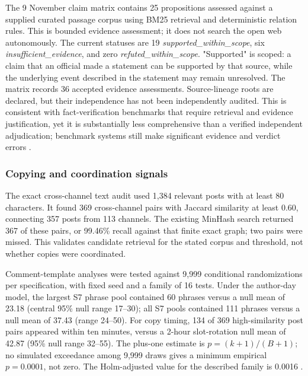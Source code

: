 The 9 November claim matrix contains 25 propositions assessed against a supplied curated passage corpus using BM25 retrieval and deterministic relation rules. This is bounded evidence assessment; it does not search the open web autonomously. The current statuses are 19 \emph{supported\_within\_scope}, six \emph{insufficient\_evidence}, and zero \emph{refuted\_within\_scope}. "Supported" is scoped: a claim that an official made a statement can be supported by that source, while the underlying event described in the statement may remain unresolved. The matrix records 36 accepted evidence assessments. Source-lineage roots are declared, but their independence has not been independently audited. This is consistent with fact-verification benchmarks that require retrieval and evidence justification, yet it is substantially less comprehensive than a verified independent adjudication; benchmark systems still make significant evidence and verdict errors \citep{thorne2018fever,schlichtkrull2023averitec,schlichtkrull2024averitecshared,rothermel2024infact}.

\subsubsection{Copying and coordination signals}

The exact cross-channel text audit used 1,384 relevant posts with at least 80 characters. It found 369 cross-channel pairs with Jaccard similarity at least 0.60, connecting 357 posts from 113 channels. The existing MinHash search returned 367 of these pairs, or 99.46\% recall against that finite exact graph; two pairs were missed. This validates candidate retrieval for the stated corpus and threshold, not whether copies were coordinated.

Comment-template analyses were tested against 9,999 conditional randomizations per specification, with fixed seed and a family of 16 tests. Under the author-day model, the largest S7 phrase pool contained 60 phrases versus a null mean of 23.18 (central 95\% null range 17--30); all S7 pools contained 111 phrases versus a null mean of 37.43 (range 24--50). For copy timing, 134 of 369 high-similarity post pairs appeared within ten minutes, versus a 2-hour slot-rotation null mean of 42.87 (95\% null range 32--55). The plus-one estimate is $p=(k+1)/(B+1)$; no simulated exceedance among 9,999 draws gives a minimum empirical $p=0.0001$, not zero. The Holm-adjusted value for the described family is 0.0016 \citep{phipson2010permutation,holm1979simple}.

